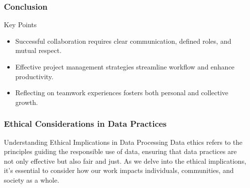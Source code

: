 \documentclass[aspectratio=169]{beamer}
\begin{document}
\begin{frame}[fragile]
    \frametitle{Conclusion}
    \begin{block}{Key Points}
        \begin{itemize}
            \item Successful collaboration requires clear communication, defined roles, and mutual respect.
            \item Effective project management strategies streamline workflow and enhance productivity.
            \item Reflecting on teamwork experiences fosters both personal and collective growth.
        \end{itemize}
    \end{block}
\end{frame}

\begin{frame}[fragile]
    \frametitle{Ethical Considerations in Data Practices}
    \begin{block}{Understanding Ethical Implications in Data Processing}
        Data ethics refers to the principles guiding the responsible use of data, ensuring that data practices are not only effective but also fair and just. 
        As we delve into the ethical implications, it’s essential to consider how our work impacts individuals, communities, and society as a whole.
    \end{block}
\end{frame}
\end{document}
